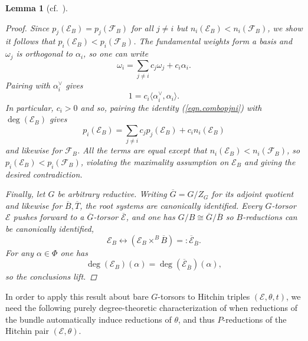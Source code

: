 \documentclass[openany]{amsbook}
\newtheorem{lemma}[theorem]{Lemma}
\theoremstyle{definition}
\theoremstyle{remark}
\numberwithin{equation}{section}
\newcommand{\cF}{\mathcal{F}}
\newcommand{\cE}{\mathcal{E}}
\newcommand{\ol}[1]{\overline{#1}}
\renewcommand{\-}{\operatorname{-}}
\begin{document}
\begin{lemma}[{{cf.\ \cite[Prop. 6.1.6]{CLI}}}]
\begin{proof}
        Since $p_j(\cE_B) = p_j(\cF_B)$ for all $j \neq i$ but $n_i(\cE_B) < n_i(\cF_B)$, we show it follows that $p_i(\cE_B) < p_i(\cF_B)$. The fundamental weights form a basis and $\omega_j$ is orthogonal to $\alpha_i$, so one can write
        \begin{equation}\label{eqn.combopjni}
            \omega_{i} = \sum_{{j \neq i}} c_j\omega_j + c_i \alpha_i.
        \end{equation}
        Pairing with $\alpha_i^\vee$ gives
        $$
            1 = c_i \langle \alpha_i^\vee, \alpha_i \rangle.
        $$
        In particular, $c_i > 0$ and so, pairing the identity (\ref{eqn.combopjni}) with $\deg(\cE_B)$ gives
        $$
            p_i(\cE_B) = \sum_{j \neq i} c_j p_j(\cE_B) + c_i n_i(\cE_B)
        $$
        and likewise for $\cF_B$. All the terms are equal except that $n_i(\cE_B) < n_i(\cF_B)$, so $p_i(\cE_B) < p_i(\cF_B)$, violating the maximality assumption on $\cE_B$ and giving the desired contradiction. 

        Finally, let $G$ be arbitrary reductive. Writing $\ol{G} = G/Z_G$ for its adjoint quotient and likewise for $\ol{B}, \ol{T}$, the root systems are canonically identified. Every $G$-torsor $\cE$ pushes forward to a $\ol{G}$-torsor $\ol{\cE}$, and one has $G/B \cong \ol{G}/\ol{B}$ so $B$-reductions can be canonically identified,
        $$ \cE_B \longleftrightarrow (\cE_B \times^B \ol{B}) =: \ol{\cE}_{\ol{B}}.$$ 
        For any $\alpha \in \Phi$ one has
        $$
            \deg(\cE_B)(\alpha) = \deg(\ol{\cE}_{\ol{B}})(\alpha),
        $$
        so the conclusions lift.
    \end{proof}
\end{lemma}

In order to apply this result about bare $G$-torsors to Hitchin triples $(\cE, \theta, t)$, we need the following purely degree-theoretic characterization of when reductions of the bundle automatically induce reductions of $\theta$, and thus $P$-reductions of the Hitchin pair $(\cE, \theta)$.
\end{document}
